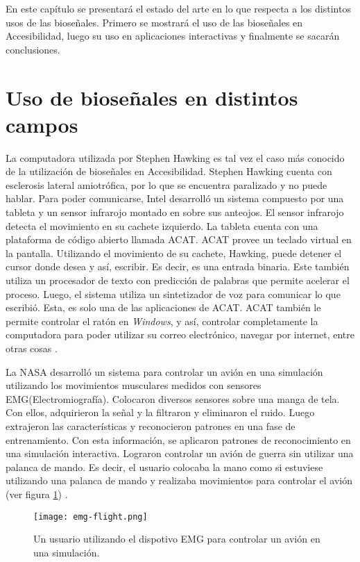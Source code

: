 En este capítulo se presentará el estado del arte en lo que respecta a los distintos usos de las bioseñales. Primero se mostrará el uso de las bioseñales en Accesibilidad, luego su uso en aplicaciones interactivas y finalmente se sacarán conclusiones. 

\section{Uso de bioseñales en distintos campos}

La computadora utilizada por Stephen Hawking es tal vez el caso más conocido de la utilización de bioseñales en Accesibilidad. Stephen Hawking cuenta con esclerosis lateral amiotrófica, por lo que se encuentra paralizado y no puede hablar. Para poder comunicarse, Intel desarrolló un sistema compuesto por una tableta y un sensor infrarojo montado en sobre sus anteojos. El sensor infrarojo detecta el movimiento en su cachete izquierdo. La tableta cuenta con una plataforma de código abierto llamada ACAT. ACAT provee un teclado virtual en la pantalla. Utilizando el movimiento de su cachete, Hawking, puede detener el cursor donde desea y así, escribir. Es decir, es una entrada binaria. Este también utiliza un procesador de texto con predicción de palabras que permite acelerar el proceso.  Luego, el sistema utiliza un sintetizador de voz para comunicar lo que escribió. Esta, es solo una de las aplicaciones de ACAT. ACAT también le permite controlar el ratón en \emph{Windows}, y así, controlar completamente la computadora para poder utilizar su correo electrónico, navegar por internet, entre otras cosas \cite{hawking}.

La NASA desarrolló un sistema para controlar un avión en una simulación utilizando los movimientos musculares medidos con sensores EMG(Electromiografía). Colocaron diversos sensores sobre una manga de tela. Con ellos, adquirieron la señal y la filtraron y eliminaron el ruido. Luego extrajeron las características y reconocieron patrones en una fase de entrenamiento. Con esta información, se aplicaron patrones de reconocimiento en una simulación interactiva. Lograron controlar un avión de guerra sin utilizar una palanca de mando. Es decir, el usuario colocaba la mano como si estuviese utilizando una palanca de mando y realizaba movimientos para controlar el avión (ver figura \ref{fig:emg-flight}) \cite{emg-flight}.

\begin{figure}[H]
	\centering
    \texttt{[image: emg-flight.png]}
    \caption{Un usuario utilizando el dispotivo EMG para controlar un avión en una simulación.}
	\label{fig:emg-flight}
\end{figure}

